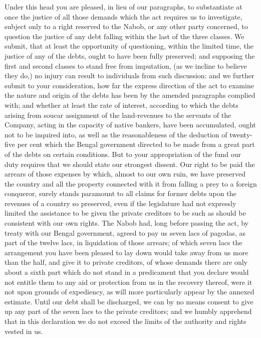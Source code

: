 Under this head you are pleased, in lieu of our paragraphs, to substantiate at once the justice of all those demands which the act requires us to investigate, subject only to a right reserved to the Nabob, or any other party concerned, to question the justice of any debt falling within the last of the three classes. We submit, that at least the opportunity of questioning, within the limited time, the justice of any of the debts, ought to have been fully preserved; and supposing the first and second classes to stand free from imputation, (as we incline to believe they do,) no injury can result to individuals from such discussion: and we further submit to your consideration, how far the express direction of the act to examine the nature and origin of the debts has been by the amended paragraphs complied with; and whether at least the rate of interest, according to which the debts arising from soucar assignment of the land-revenues to the servants of the Company, acting in the capacity of native bankers, have been accumulated, ought not to be inquired into, as well as the reasonableness of the deduction of twenty-five per cent which the Bengal government directed to be made from a great part of the debts on certain conditions. But to your appropriation of the fund our duty requires that we should state our strongest dissent. Our right to be paid the arrears of those expenses by which, almost to our own ruin, we have preserved the country and all the property connected with it from falling a prey to a foreign conqueror, surely stands paramount to all claims for former debts upon the revenues of a country so preserved, even if the legislature had not expressly limited the assistance to be given the private creditors to be such as should be consistent with our own rights. The Nabob had, long before passing the act, by treaty with our Bengal government, agreed to pay us seven lacs of pagodas, as part of the twelve lacs, in liquidation of those arrears; of which seven lacs the arrangement you have been pleased to lay down would take away from us more than the half, and give it to private creditors, of whose demands there are only about a sixth part which do not stand in a predicament that you declare would not entitle them to any aid or protection from us in the recovery thereof, were it not upon grounds of expediency, as will more particularly appear by the annexed estimate. Until our debt shall be discharged, we can by no means consent to give up any part of the seven lacs to the private creditors; and we humbly apprehend that in this declaration we do not exceed the limits of the authority and rights vested in us.


